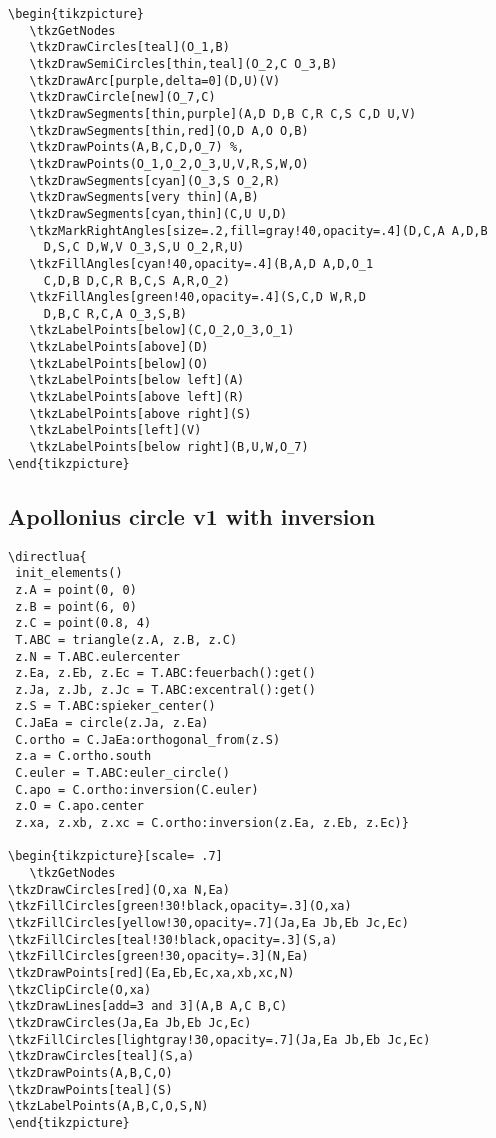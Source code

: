 \begin{verbatim}
\begin{tikzpicture}
   \tkzGetNodes
   \tkzDrawCircles[teal](O_1,B)
   \tkzDrawSemiCircles[thin,teal](O_2,C O_3,B)
   \tkzDrawArc[purple,delta=0](D,U)(V)
   \tkzDrawCircle[new](O_7,C)
   \tkzDrawSegments[thin,purple](A,D D,B C,R C,S C,D U,V)
   \tkzDrawSegments[thin,red](O,D A,O O,B)
   \tkzDrawPoints(A,B,C,D,O_7) %,
   \tkzDrawPoints(O_1,O_2,O_3,U,V,R,S,W,O)
   \tkzDrawSegments[cyan](O_3,S O_2,R)
   \tkzDrawSegments[very thin](A,B)
   \tkzDrawSegments[cyan,thin](C,U U,D)
   \tkzMarkRightAngles[size=.2,fill=gray!40,opacity=.4](D,C,A A,D,B
     D,S,C D,W,V O_3,S,U O_2,R,U)
   \tkzFillAngles[cyan!40,opacity=.4](B,A,D A,D,O_1
     C,D,B D,C,R B,C,S A,R,O_2)
   \tkzFillAngles[green!40,opacity=.4](S,C,D W,R,D
     D,B,C R,C,A O_3,S,B)
   \tkzLabelPoints[below](C,O_2,O_3,O_1)
   \tkzLabelPoints[above](D)
   \tkzLabelPoints[below](O)
   \tkzLabelPoints[below left](A)
   \tkzLabelPoints[above left](R)
   \tkzLabelPoints[above right](S)
   \tkzLabelPoints[left](V)
   \tkzLabelPoints[below right](B,U,W,O_7)
\end{tikzpicture}
\end{verbatim}

\subsection{Apollonius circle v1 with inversion} %
\label{sub:apollonius_circle_v1_with_inversion}
\begin{verbatim}
\directlua{
 init_elements()
 z.A = point(0, 0)
 z.B = point(6, 0)
 z.C = point(0.8, 4)
 T.ABC = triangle(z.A, z.B, z.C)
 z.N = T.ABC.eulercenter
 z.Ea, z.Eb, z.Ec = T.ABC:feuerbach():get()
 z.Ja, z.Jb, z.Jc = T.ABC:excentral():get()
 z.S = T.ABC:spieker_center()
 C.JaEa = circle(z.Ja, z.Ea)
 C.ortho = C.JaEa:orthogonal_from(z.S)
 z.a = C.ortho.south
 C.euler = T.ABC:euler_circle()
 C.apo = C.ortho:inversion(C.euler)
 z.O = C.apo.center
 z.xa, z.xb, z.xc = C.ortho:inversion(z.Ea, z.Eb, z.Ec)}

\begin{tikzpicture}[scale= .7]
   \tkzGetNodes
\tkzDrawCircles[red](O,xa N,Ea)
\tkzFillCircles[green!30!black,opacity=.3](O,xa)
\tkzFillCircles[yellow!30,opacity=.7](Ja,Ea Jb,Eb Jc,Ec)
\tkzFillCircles[teal!30!black,opacity=.3](S,a)
\tkzFillCircles[green!30,opacity=.3](N,Ea)
\tkzDrawPoints[red](Ea,Eb,Ec,xa,xb,xc,N)
\tkzClipCircle(O,xa)
\tkzDrawLines[add=3 and 3](A,B A,C B,C)
\tkzDrawCircles(Ja,Ea Jb,Eb Jc,Ec)
\tkzFillCircles[lightgray!30,opacity=.7](Ja,Ea Jb,Eb Jc,Ec)
\tkzDrawCircles[teal](S,a)
\tkzDrawPoints(A,B,C,O)
\tkzDrawPoints[teal](S)
\tkzLabelPoints(A,B,C,O,S,N)
\end{tikzpicture}
\end{verbatim}

